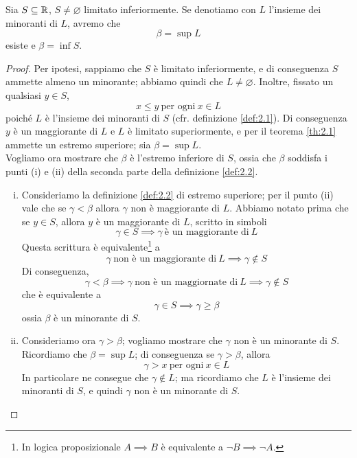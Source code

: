 \begin{corollary}
    \label{cor:2.1}
    Sia $S\subseteq \amsbb{R}$, $S\ne \varnothing$ limitato inferiormente. Se denotiamo con $L$ l'insieme dei minoranti di $L$, avremo che
    \[
    \beta = \sup L
    \]
    esiste e $\beta = \inf S$.
\end{corollary}
\begin{proof}
    Per ipotesi, sappiamo che $S$ è limitato inferiormente, e di conseguenza $S$ ammette almeno un minorante; abbiamo quindi che $L\ne \varnothing$. Inoltre, fissato un qualsiasi $y\in S$, 
    \[
    x\le y \ \text{per ogni} \ x\in L
    \]
    poiché $L$ è l'insieme dei minoranti di $S$ (cfr. definizione \ref{def:2.1}). Di conseguenza $y$ è un maggiorante di $L$ e $L$ è limitato superiormente, e per il teorema \ref{th:2.1} ammette un estremo superiore; sia $\beta = \sup L$.\\
    Vogliamo ora mostrare che $\beta$ è l'estremo inferiore di $S$, ossia che $\beta$ soddisfa i punti (i) e (ii) della seconda parte della  definizione \ref{def:2.2}. 
    \begin{enumerate}[(i)]
        \item Consideriamo la definizione \ref{def:2.2} di estremo superiore; per il punto (ii) vale che se $\gamma <\beta$ allora $\gamma$ non è maggiorante di $L$. Abbiamo notato prima che se $y\in S$, allora $y$ è un maggiorante di $L$, scritto in simboli
        \[
        \gamma\in S \implies \gamma \ \text{è un maggiorante di}\ L
        \]
        Questa scrittura è equivalente\footnote{In logica proposizionale $A\implies B$ è equivalente a $\neg B \implies \neg A$.} a
        \[
        \gamma\  \text{non è un maggiorante di} \ L \implies \gamma \notin S
        \]
        Di conseguenza, 
        \[
        \gamma < \beta \implies \gamma \ \text{non è un maggiornate di} \ L \implies \gamma \notin S
        \]
        che è equivalente a 
        \[
        \gamma \in S \implies \gamma \ge \beta 
        \]
        ossia $\beta$ è un minorante di $S$.
        \item Consideriamo ora $\gamma>\beta$; vogliamo mostrare che $\gamma$ non è un minorante di $S$. Ricordiamo che $\beta = \sup L$; di conseguenza se $\gamma>\beta$, allora
        \[
        \gamma > x \ \text{per ogni} \ x\in L
        \]
        In particolare ne consegue che $\gamma\notin L$; ma ricordiamo che $L$ è l'insieme dei minoranti di $S$, e quindi $\gamma$ non è un minorante di $S$. \qedhere
    \end{enumerate}
\end{proof}
